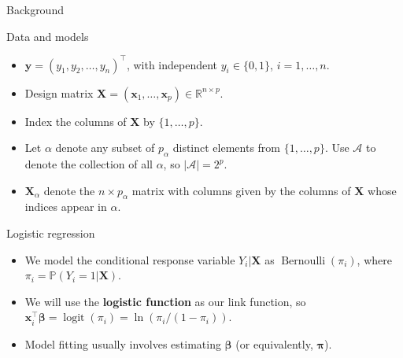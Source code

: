 \documentclass[12pt,aspectratio=169]{beamer}
\newcommand{\bx}{\boldsymbol{x}}
\newcommand{\bX}{\boldsymbol{X}}
\newcommand{\by}{\boldsymbol{y}}
\newcommand{\bbeta}{\boldsymbol{\beta}}
\newcommand{\bPi}{\boldsymbol{\pi}}
\begin{document}
\begin{frame}
\Huge{\color{themeBlue} Background}
\end{frame}


\begin{frame}{Data and models}
	\begin{itemize}
		\item $ \by = (y_1, y_2, \dots, y_n)^\top $, with independent $ y_i  \in \lbrace0, 1\rbrace$, $ i = 1, \dots, n $. 
		\item Design matrix $ \bX = (\bx_1, \dots, \bx_p) \in \mathbb{R}^{n \times p}$. 
		\item Index the columns of $ \bX $ by $ \lbrace 1, \dots, p \rbrace$. 
		\item 
		Let $ \alpha $ denote any subset of $ p_\alpha $ distinct elements from $ \lbrace 1, \dots, p \rbrace $. Use $ \mathcal{A} $ to denote the collection of all $ \alpha $, so $ |\mathcal{A}| = 2^p $.
		
		\item $ \bX_\alpha $ denote the $ n \times p_\alpha $ matrix with columns given by the columns of $ \bX $ whose indices appear in $ \alpha $.
	\end{itemize}
\end{frame}

\begin{frame}{Logistic regression}
 \begin{itemize}
 	\item We model the conditional response variable $ Y_i | \bX$ as $ \operatorname{Bernoulli}(\pi_i) $, where $ \pi_i = \mathbb{P}(Y_i  = 1| \bX)$. 
 	\item We will use the \textbf{logistic function} as our link function, so $ \bx_i^\top \bbeta = \operatorname{logit}(\pi_i) = \ln \left( \pi_i/(1-\pi_i) \right)$.
 	\item Model fitting usually involves estimating $ \bbeta $ (or equivalently, $ \bPi $). 
 \end{itemize}
\end{frame}
\end{document}
